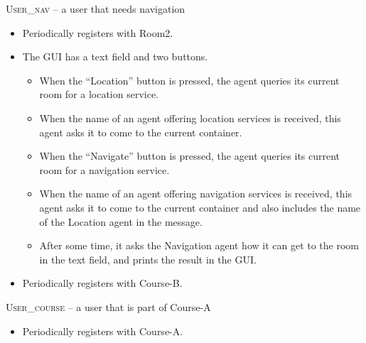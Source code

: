 \documentclass[a4paper, 12pt, twoside]{article}
\begin{document}
\textsc{User\_nav} -- a user that needs navigation
\begin{itemize}
	\item Periodically registers with Room2.
	\item The GUI has a text field and two buttons.
	\begin{itemize}
		\item When the ``Location'' button is pressed, the agent queries its current room for a location service.
		\item When the name of an agent offering location services is received, this agent asks it to come to the current container.
		\item When the ``Navigate'' button is pressed, the agent queries its current room for a navigation service.
		\item When the name of an agent offering navigation services is received, this agent asks it to come to the current container and also includes the name of the Location agent in the message.
		\item After some time, it asks the Navigation agent how it can get to the room in the text field, and prints the result in the GUI.
	\end{itemize}
	\item Periodically registers with Course-B.
\end{itemize}


\textsc{User\_course} -- a user that is part of Course-A
\begin{itemize}
	\item Periodically registers with Course-A.
\end{itemize}
\end{document}
